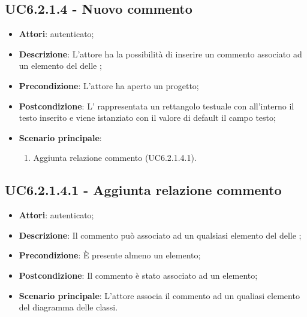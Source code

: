 \subsection{UC6.2.1.4 - Nuovo commento}
\label{ssec:UC6.2.1.4}
\begin{itemize}
\item \textbf{Attori}:  autenticato;
\item \textbf{Descrizione}: L'attore ha la possibilità di inserire un commento associato ad un elemento del  delle ;
\item \textbf{Precondizione}: L'attore ha aperto un progetto;
\item \textbf{Postcondizione}: L' rappresentata un rettangolo testuale con all'interno il testo inserito e viene istanziato con il valore di default il campo testo;
\item \textbf{Scenario principale}: \begin{enumerate}\item Aggiunta relazione commento (UC6.2.1.4.1).
 \end{enumerate}
\end{itemize}
\subsection{UC6.2.1.4.1 - Aggiunta relazione commento}
\label{ssec:UC6.2.1.4.1}
\begin{itemize}
\item \textbf{Attori}:  autenticato;
\item \textbf{Descrizione}: Il commento può associato ad un qualsiasi elemento del  delle ;
\item \textbf{Precondizione}: È presente almeno un elemento;
\item \textbf{Postcondizione}: Il commento è stato associato ad un elemento;
\item \textbf{Scenario principale}: L'attore associa il commento ad un qualiasi elemento del diagramma delle classi.
\end{itemize}
